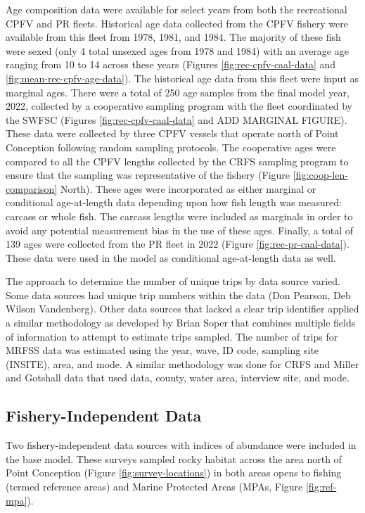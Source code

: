 \documentclass[11pt,
  english,
  letterpaper,
]{article}
\begin{document}
Age composition data were available for select years from both the recreational CPFV and PR fleets. Historical age data collected from the CPFV fishery were available from this fleet from 1978, 1981, and 1984. The majority of these fish were sexed (only 4 total unsexed ages from 1978 and 1984) with an average age ranging from 10 to 14 across these years (Figures \ref{fig:rec-cpfv-caal-data} and \ref{fig:mean-rec-cpfv-age-data}). The historical age data from this fleet were input as marginal ages. There were a total of 250 age samples from the final model year, 2022, collected by a cooperative sampling program with the fleet coordinated by the SWFSC (Figures \ref{fig:rec-cpfv-caal-data} and ADD MARGINAL FIGURE). These data were collected by three CPFV vessels that operate north of Point Conception following random sampling protocols. The cooperative ages were compared to all the CPFV lengths collected by the CRFS sampling program to ensure that the sampling was representative of the fishery (Figure \ref{fig:coop-len-comparison} North). These ages were incorporated as either marginal or conditional age-at-length data depending upon how fish length was measured: carcass or whole fish. The carcass lengths were included as marginals in order to avoid any potential measurement bias in the use of these ages. Finally, a total of 139 ages were collected from the PR fleet in 2022 (Figure \ref{fig:rec-pr-caal-data}). These data were used in the model as conditional age-at-length data as well.

The approach to determine the number of unique trips by data source varied. Some data sources had unique trip numbers within the data (Don Pearson, Deb Wilson Vandenberg). Other data sources that lacked a clear trip identifier applied a similar methodology as developed by Brian Soper that combines multiple fields of information to attempt to estimate trips sampled. The number of trips for MRFSS data was estimated using the year, wave, ID code, sampling site (INSITE), area, and mode. A similar methodology was done for CRFS and Miller and Gotshall data that used data, county, water area, interview site, and mode.

\hypertarget{fishery-independent-data}{%
\subsection{Fishery-Independent Data}\label{fishery-independent-data}}

Two fishery-independent data sources with indices of abundance were included in the base model. These surveys sampled rocky habitat across the area north of Point Conception (Figure \ref{fig:survey-locations}) in both areas opens to fishing (termed reference areas) and Marine Protected Areas (MPAs, Figure \ref{fig:ref-mpa}).
\end{document}
